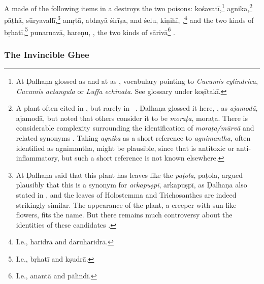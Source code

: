 \begin{translation}
A  made of the following items in a
 destroys the two poisons:
\gls{kośavatī},\footnote{At  Ḍalhaṇa glossed
     as  and at  as
    , vocabulary pointing to \emph{Cucumis cylindrica},
    \emph{Cucumis actangula} or \emph{Luffa echinata}. See glossary under
    \gls{koṣītakī}.} \gls{agnika},\footnote{A plant often cited in \SS,
        but rarely in \CS\ \citep[4]{gvdb}.  Ḍalhaṇa glossed it here,
        , as \emph{ajamodā}, \gls{ajamodā},  but noted that
        others consider it to be \emph{moraṭa}, \gls{moraṭa}. There is
        considerable complexity surrounding the identification of
        \emph{moraṭa/mūrvā} and related synonyms \citep[314-316]{gvdb}.
        Taking \emph{agnika} as a short reference to \emph{agnimantha}, often
        identified  as \gls{agnimantha}, might be plausible, since that is
        antitoxic or anti-inflammatory, but such a short reference is not
        known elsewhere.} \gls{pāṭhā}, \gls{sūryavallī},\footnote{At
             Ḍalhaṇa said that this plant has leaves like the
            \emph{paṭola}, \gls{paṭola}, \citet[280, 443]{gvdb} argued plausibly
            that this is a synonym for \emph{arkapuṣpī}, \gls{arkapuṣpī}, as
            Ḍalhaṇa also stated in , and the leaves of
            Holostemma and Trichosanthes are indeed strikingly similar.  The
            appearance of the plant, a creeper with sun-like flowers, fits the
            name.  But there remains much controversy about the identities of
            these candidates \citep[e.g.,][195--198]{adps}.} %
            \gls{amṛtā}, \gls{abhayā} \gls{śirīṣa}, and \gls{śelu},
            \gls{kiṇihī}, ,\footnote{I.e., \gls{haridrā} and
                \gls{dāruharidrā}.} and the two kinds of
                \gls{bṛhatī},\footnote{I.e., \gls{bṛhatī} and
                    \gls{kṣudrā}.} \gls{punarnavā}, \gls{hareṇu}, , %
                    the two kinds of \gls{sārivā}\footnote{I.e.,
                        \gls{anantā} and \gls{pālindī}.} %
                        .
  \end{translation}


\subsubsection{The Invincible Ghee}
    

